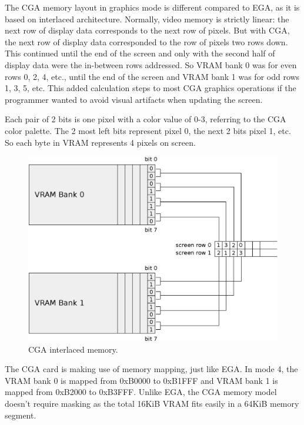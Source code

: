 \documentclass[book.tex]{subfiles}
\begin{document}
The CGA memory layout in graphics mode is different compared to EGA, as it is based on interlaced architecture.
Normally, video memory is strictly linear: the next row of display data corresponds to the next row of pixels. But with CGA, the next row of display data corresponded to the row of pixels two rows down. This continued until the end of the screen and only with the second half of display data were the in-between rows addressed. So VRAM bank 0 was for even rows 0, 2, 4, etc., until the end of the screen and VRAM bank 1 was for odd rows 1, 3, 5, etc. This added calculation steps to most CGA graphics operations if the programmer wanted to avoid visual artifacts when updating the screen.\\
\par
Each pair of 2 bits is one pixel with a color value of 0-3, referring to the CGA color palette. The 2 most left bits represent pixel 0, the next 2 bits pixel 1, etc. So each byte in VRAM represents 4 pixels on screen. \\






\begin{figure}[H]
\centering
\includegraphics[width=1.0\textwidth]{imgs/drawings/cga_interlace.eps}
\caption{CGA interlaced memory.}
\label{fig:cga_interlaced}
\end{figure}


\par
The CGA card is making use of memory mapping, just like EGA. In mode 4, the VRAM bank 0 is mapped from 0xB0000 to 0xB1FFF and VRAM bank 1 is mapped from 0xB2000 to 0xB3FFF. Unlike EGA, the CGA memory model doesn't require masking as the total 16KiB VRAM fits easily in a 64KiB memory segment.\\ 
\end{document}
